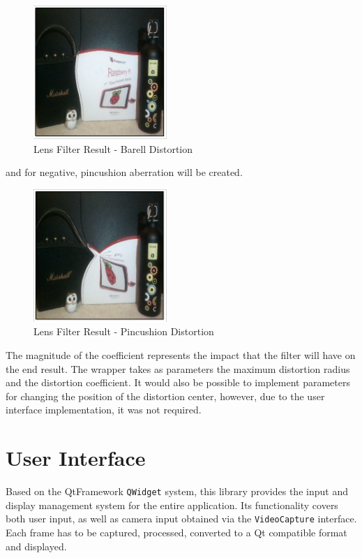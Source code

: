 \begin{figure}[H]
	\includegraphics[width=0.45\textwidth, height=0.45\textwidth]{resources/Lens_2.png}
	\caption{Lens Filter Result - Barell Distortion}
\end{figure}

and for negative, pincushion aberration will be created.

\begin{figure}[H]
	\includegraphics[width=0.45\textwidth, height=0.45\textwidth]{resources/Lens_4.png}
	\caption{Lens Filter Result - Pincushion Distortion}
\end{figure}

The magnitude of the coefficient represents the impact that the filter
will have on the end result. The wrapper takes as parameters the maximum distortion radius and the distortion
coefficient. It would also be possible to implement parameters for changing the position of the distortion
center, however, due to the user interface implementation, it was not required.

\section{User Interface}

Based on the QtFramework \verb|QWidget| system, this library provides the input and display management system
for the entire application. Its functionality covers both user input, as well as camera input obtained via
the \verb|VideoCapture| interface. Each frame has to be captured, processed, converted to a Qt compatible
format and displayed.

